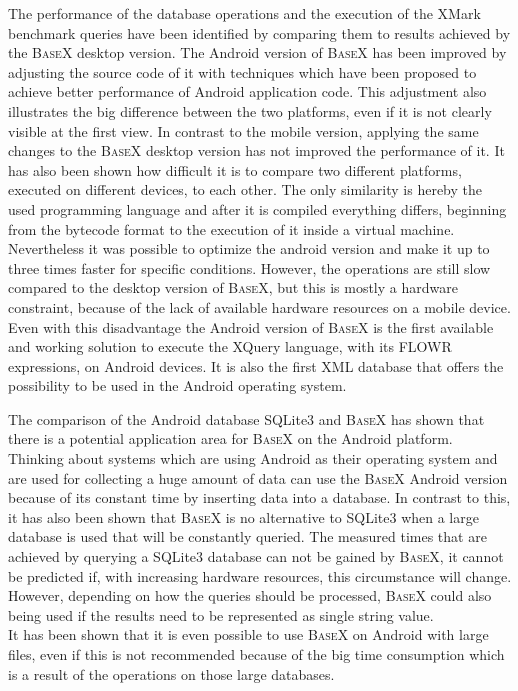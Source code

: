 The performance of the database operations and the execution of the XMark benchmark queries have been identified by comparing them to results achieved by the \textsc{BaseX} desktop version.
The Android version of \textsc{BaseX} has been improved by adjusting the source code of it with techniques which have been proposed to achieve better performance of Android application code.
This adjustment also illustrates the big difference between the two platforms, even if it is not clearly visible at the first view.
In contrast to the mobile version, applying the same changes to the \textsc{BaseX} desktop version has not improved the performance of it.
It has also been shown how difficult it is to compare two different platforms, executed on different devices, to each other.
The only similarity is hereby the used programming language and after it is compiled everything differs, beginning from the bytecode format to the execution of it inside a virtual machine.
Nevertheless it was possible to optimize the android version and make it up to three times faster for specific conditions.
However, the operations are still slow compared to the desktop version of \textsc{BaseX}, but this is mostly a hardware constraint, because of the lack of available hardware resources on a mobile device.
Even with this disadvantage the Android version of \textsc{BaseX} is the first available and working solution to execute the XQuery language, with its FLOWR expressions, on Android devices.
It is also the first XML database that offers the possibility to be used in the Android operating system.


The comparison of the Android database SQLite3 and \textsc{BaseX} has shown that there is a potential application area for \textsc{BaseX} on the Android platform.
Thinking about systems which are using Android as their operating system and are used for collecting a huge amount of data can use the \textsc{BaseX} Android version because of its constant time by inserting data into a database. 
In contrast to this, it has also been shown that \textsc{BaseX} is no alternative to SQLite3 when a large database is used that will be constantly queried.
The measured times that are achieved by querying a SQLite3 database can not be gained by \textsc{BaseX}, it cannot be predicted if, with increasing hardware resources, this circumstance will change.
However, depending on how the queries should be processed, \textsc{BaseX} could also being used if the results need to be represented as single string value.\\
It has been shown that it is even possible to use \textsc{BaseX} on Android with large files, even if this is not recommended because of the big time consumption which is a result of the operations on those large databases.


